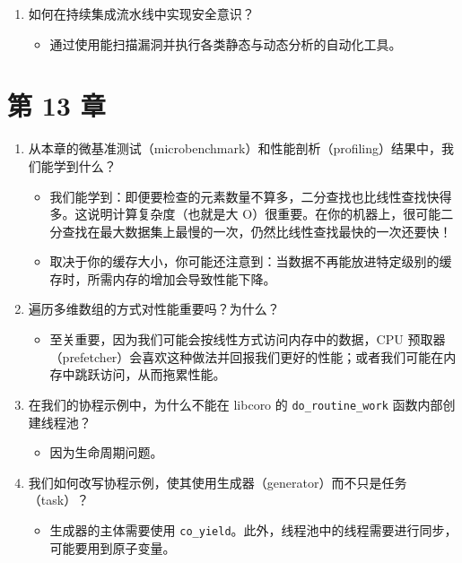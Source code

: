 \begin{enumerate}
\begin{itemize}
\item 现代编译器包含用于检查某些缺陷的 sanitizer。
\end{itemize}
\item 如何在持续集成流水线中实现安全意识？

\begin{itemize}
\item 通过使用能扫描漏洞并执行各类静态与动态分析的自动化工具。
\end{itemize}
\end{enumerate}

\section*{第 13 章}

\begin{enumerate}
\item 从本章的微基准测试（microbenchmark）和性能剖析（profiling）结果中，我们能学到什么？

\begin{itemize}
\item 我们能学到：即便要检查的元素数量不算多，二分查找也比线性查找快得多。这说明计算复杂度（也就是大 O）很重要。在你的机器上，很可能二分查找在最大数据集上最慢的一次，仍然比线性查找最快的一次还要快！
\item 取决于你的缓存大小，你可能还注意到：当数据不再能放进特定级别的缓存时，所需内存的增加会导致性能下降。
\end{itemize}
\item 遍历多维数组的方式对性能重要吗？为什么？

\begin{itemize}
\item 至关重要，因为我们可能会按线性方式访问内存中的数据，CPU 预取器（prefetcher）会喜欢这种做法并回报我们更好的性能；或者我们可能在内存中跳跃访问，从而拖累性能。
\end{itemize}
\item 在我们的协程示例中，为什么不能在 libcoro 的 \texttt{do\_\allowbreak{}routine\_\allowbreak{}work} 函数内部创建线程池？

\begin{itemize}
\item 因为生命周期问题。
\end{itemize}
\item 我们如何改写协程示例，使其使用生成器（generator）而不只是任务（task）？

\begin{itemize}
\item 生成器的主体需要使用 \texttt{co\_yield}。此外，线程池中的线程需要进行同步，可能要用到原子变量。
\end{itemize}
\end{enumerate}

